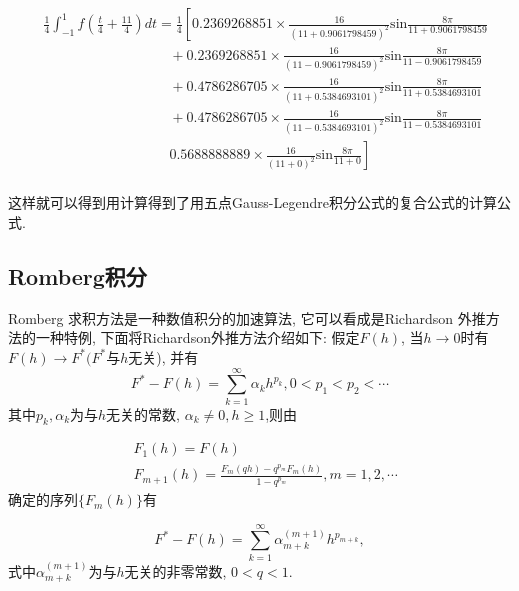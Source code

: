 \documentclass[a4paper]{article}
\begin{document}
\begin{spacing}{1.5}
\begin{CJK*}{GBK}{song}
\begin{equation}
\begin{split}
& \frac{1}{4}\int_{-1}^1 f\left(\frac{t}{4} + \frac{11}{4}\right)dt = \frac{1}{4}\left[0.2369268851 \times \frac{16}{(11+0.9061798459)^2}\text{sin}\frac{8\pi}{11+0.9061798459}\right.\\
& \quad \quad  \quad \quad \quad  \quad \quad \quad  \quad+ 0.2369268851 \times \frac{16}{(11-0.9061798459 )^2}\text{sin}\frac{8\pi}{11-0.9061798459} \\
& \quad \quad  \quad \quad \quad  \quad  \quad \quad  \quad+0.4786286705 \times \frac{16}{(11+0.5384693101)^2}\text{sin}\frac{8\pi}{11+0.5384693101} \\
& \quad \quad  \quad \quad \quad  \quad \quad \quad  \quad+ 0.4786286705\times  \frac{16}{(11-0.5384693101)^2}\text{sin}\frac{8\pi}{11-0.5384693101} \\
&\quad \quad  \quad \quad \quad  \quad\quad \quad  \quad \left.0.5688888889\times \frac{16}{(11+0)^2}\text{sin}\frac{8\pi}{11+0}\right] \\
\end{split}
\end{equation}

这样就可以得到用计算得到了用五点Gauss-Legendre积分公式的复合公式的计算公式.

\subsection{Romberg积分}
Romberg 求积方法是一种数值积分的加速算法, 它可以看成是Richardson 外推方法的一种特例, 下面将Richardson外推方法介绍如下:
假定$F(h)$, 当$h\rightarrow 0$时有$F(h)\rightarrow F^*(F^*$与$h$无关), 并有
\begin{equation}\label{Richardson1}
  F^*-F(h)=\sum^{\infty}_{k=1} \alpha_kh^{p_k}, 0<p_1<p_2<\cdots
\end{equation}
其中$p_k,\alpha_k$为与$h$无关的常数, $\alpha_k\neq 0, h \geqslant 1$,则由

\begin{equation}\label{Richardson_ite}
 \begin{split}
 & F_1(h)=F(h) \\
 & F_{m+1}(h) = \frac{F_m(qh)-q^{p_m}F_m(h)}{1-q^{p_m}}, m=1, 2,\cdots
\end{split}
\end{equation}
确定的序列$\{F_m(h)\}$有

\begin{equation}\label{Richardsonerr}
  F^*-F(h)=\sum^{\infty}_{k=1} \alpha_{m+k}^{(m+1)}h^{p_{m+k}},
\end{equation}
式中$\alpha_{m+k}^{(m+1)}$为与$h$无关的非零常数, $0<q<1$. \\


\end{CJK*}
\end{spacing}
\end{document}
